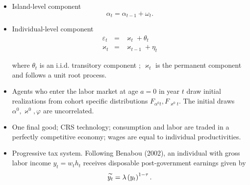 \documentclass[notes=show]{beamer}
\begin{document}
\begin{frame}%


\begin{itemize}
\item Island-level component%
\begin{equation}
\alpha _{t}=\alpha _{t-1}+\omega _{t}.
\end{equation}

\item Individual-level component%
\begin{eqnarray}
\varepsilon _{t} &=&\varkappa _{t}+\theta _{t} \\
\varkappa _{t} &=&\varkappa _{t-1}+\eta _{t}
\end{eqnarray}

where $\theta _{t}$ is an i.i.d. transitory component ; $\varkappa _{t}$ is
the permanent component and follows a unit root process.

\item Agents who enter the labor market at age $a=0$ in year $t$ draw
initial realizations from cohort specific distributions $F_{\alpha
^{0}t},F_{\varkappa ^{0}t}$. The initial draws $\alpha ^{0},\varkappa
^{0},\varphi $ are uncorrelated.
\end{itemize}

\transboxout%
\end{frame}%

\bigskip

\begin{frame}%


\begin{itemize}
\item One final good; CRS technology; consumption and labor are traded in a
perfectly competitive economy; wages are equal to individual productivities.

\item Progressive tax system. Following Benabou (2002), an individual with
gross labor income $y_{t}=w_{t}h_{t}$ receives disposable post-government
earnings given by 
\begin{equation}
\overset{\thicksim }{y_{t}}=\lambda \left( y_{t}\right) ^{1-\tau }.
\end{equation}
\end{itemize}

\transboxout%
\end{frame}%
\end{document}
